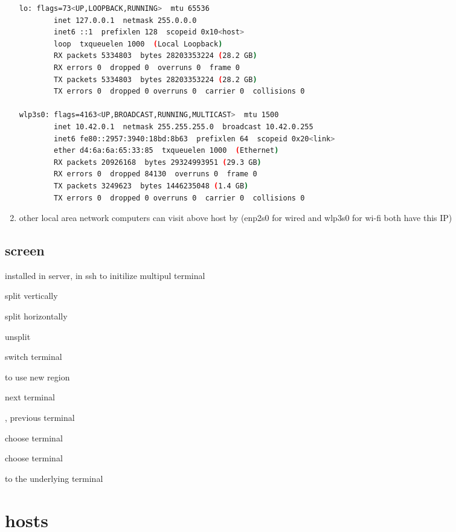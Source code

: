 \begin{enumerate}
\begin{lstlisting}[language=bash, caption={ifconig (wired connected)}]
lo: flags=73<UP,LOOPBACK,RUNNING>  mtu 65536
        inet 127.0.0.1  netmask 255.0.0.0
        inet6 ::1  prefixlen 128  scopeid 0x10<host>
        loop  txqueuelen 1000  (Local Loopback)
        RX packets 5334803  bytes 28203353224 (28.2 GB)
        RX errors 0  dropped 0  overruns 0  frame 0
        TX packets 5334803  bytes 28203353224 (28.2 GB)
        TX errors 0  dropped 0 overruns 0  carrier 0  collisions 0

wlp3s0: flags=4163<UP,BROADCAST,RUNNING,MULTICAST>  mtu 1500
        inet 10.42.0.1  netmask 255.255.255.0  broadcast 10.42.0.255
        inet6 fe80::2957:3940:18bd:8b63  prefixlen 64  scopeid 0x20<link>
        ether d4:6a:6a:65:33:85  txqueuelen 1000  (Ethernet)
        RX packets 20926168  bytes 29324993951 (29.3 GB)
        RX errors 0  dropped 84130  overruns 0  frame 0
        TX packets 3249623  bytes 1446235048 (1.4 GB)
        TX errors 0  dropped 0 overruns 0  carrier 0  collisions 0

\end{lstlisting}
\item other local area network computers can visit above host by  (enp2s0 for wired and wlp3s0 for wi-fi both have this IP)
\end{enumerate}

\subsection{screen}

 installed in server, in ssh to initilize multipul terminal

 split vertically

 split horizontally

 unsplit

 switch terminal

 to use new region

 next terminal

, previous terminal

 choose terminal

 choose terminal

 to the underlying terminal

\section{hosts}

